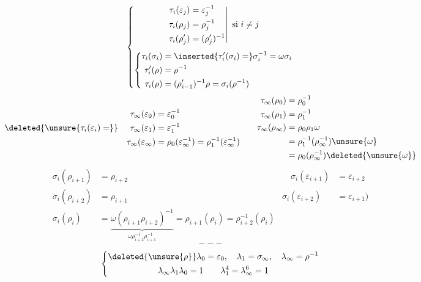 \[
\left\{\begin{gathered}
\left.\begin{aligned}
\tau_i(\varepsilon_j)&=\varepsilon_j^{-1}\\
\tau_i(\rho_j)&=\rho_j^{-1}\\
\tau_i(\rho'_j)&=(\rho'_j)^{-1}
\end{aligned}\right|\ \text{si }i\ne j\\[4pt]
\left\{\begin{aligned}
\tau_i(\sigma_i)&=\inserted{\tau'_i(\sigma_i)=}\sigma_i^{-1}=\omega\sigma_i\\
\tau'_i(\rho)&=\rho^{-1}\\
\tau_i(\rho)&=(\rho'_{i-1})^{-1}\rho=\sigma_i(\rho^{-1})
\end{aligned}\right.
\end{gathered}\right.
\]
\[
\deleted{\unsure{\tau_i(\varepsilon_i)=}}\quad
\begin{aligned}
\tau_\infty(\varepsilon_0)&=\varepsilon_0^{-1}\\
\tau_\infty(\varepsilon_1)&=\varepsilon_1^{-1}\\
\tau_\infty(\varepsilon_\infty)&=\rho_0(\varepsilon_\infty^{-1})
=\rho_1^{-1}(\varepsilon_\infty^{-1})
\end{aligned}
\qquad
\begin{aligned}
\tau_\infty(\rho_0)&=\rho_0^{-1}\\
\tau_\infty(\rho_1)&=\rho_1^{-1}\\
\tau_\infty(\rho_\infty)&=\rho_0\rho_1\omega\\
&=\rho_1^{-1}(\rho_\infty^{-1})\unsure{\omega}\\
&=\rho_0(\rho_\infty^{-1})\deleted{\unsure{\omega}}
\end{aligned}
\]
\[
\begin{aligned}
\sigma_i(\rho_{i+1})&=\rho_{i+2}&\quad\sigma_i(\varepsilon_{i+1})&=\varepsilon_{i+2}\\
\sigma_i(\rho_{i+2})&=\rho_{i+1}&\sigma_i(\varepsilon_{i+2})&=\varepsilon_{i+1})\\
\sigma_i(\rho_i)&=\underbrace{\omega(\rho_{i+1}\rho_{i+2})^{-1}}_{\omega\rho_{i+2}^{-1}\rho_{i+1}^{-1}}
=\rho_{i+1}(\rho_i)=\rho_{i+2}^{-1}(\rho_i)
\end{aligned}
\]
\[\mathbin{---}\]
\[
\left\{\begin{gathered}
\deleted{\unsure{\rho}}\lambda_0=\varepsilon_0,\quad\lambda_1=\sigma_\infty,
\quad\lambda_\infty=\rho^{-1}\\
\lambda_\infty\lambda_1\lambda_0=1\qquad\lambda_1^4=\lambda_\infty^6=1
\end{gathered}\right.
\]
